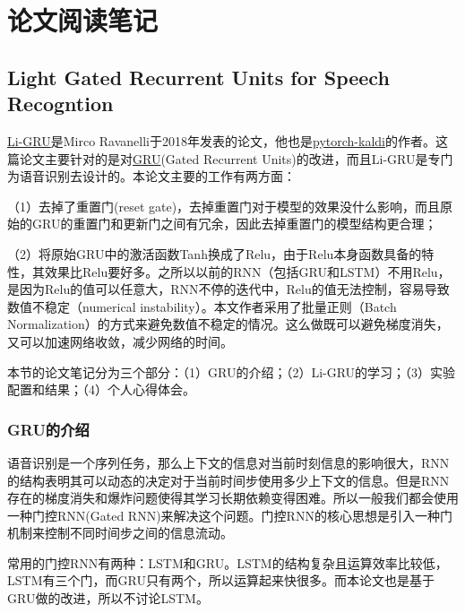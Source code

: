 \chapter{论文阅读笔记}

\section{Light Gated Recurrent Units for Speech Recogntion}
\href{https://arxiv.org/abs/1803.10225}{Li-GRU}是Mirco Ravanelli于2018年发表的论文，他也是\href{https://arxiv.org/abs/1811.07453}{pytorch-kaldi}的作者。这篇论文主要针对的是对\href{https://arxiv.org/abs/1406.1078}{GRU}(Gated Recurrent Units)的改进，而且Li-GRU是专门为语音识别去设计的。本论文主要的工作有两方面：

（1）去掉了重置门(reset gate)，去掉重置门对于模型的效果没什么影响，而且原始的GRU的重置门和更新门之间有冗余，因此去掉重置门的模型结构更合理；
  
（2）将原始GRU中的激活函数Tanh换成了Relu，由于Relu本身函数具备的特性，其效果比Relu要好多。之所以以前的RNN（包括GRU和LSTM）不用Relu，是因为Relu的值可以任意大，RNN不停的迭代中，Relu的值无法控制，容易导致数值不稳定（numerical instability）。本文作者采用了批量正则（Batch Normalization）的方式来避免数值不稳定的情况。这么做既可以避免梯度消失，又可以加速网络收敛，减少网络的时间。


本节的论文笔记分为三个部分：（1）GRU的介绍；（2）Li-GRU的学习；（3）实验配置和结果；（4）个人心得体会。

\subsection{GRU的介绍}
\label{sec:gru}
语音识别是一个序列任务，那么上下文的信息对当前时刻信息的影响很大，RNN的结构表明其可以动态的决定对于当前时间步使用多少上下文的信息。但是RNN存在的梯度消失和爆炸问题使得其学习长期依赖变得困难。所以一般我们都会使用一种门控RNN(Gated RNN)来解决这个问题。门控RNN的核心思想是引入一种门机制来控制不同时间步之间的信息流动。

常用的门控RNN有两种：LSTM和GRU。LSTM的结构复杂且运算效率比较低，LSTM有三个门，而GRU只有两个，所以运算起来快很多。而本论文也是基于GRU做的改进，所以不讨论LSTM。


